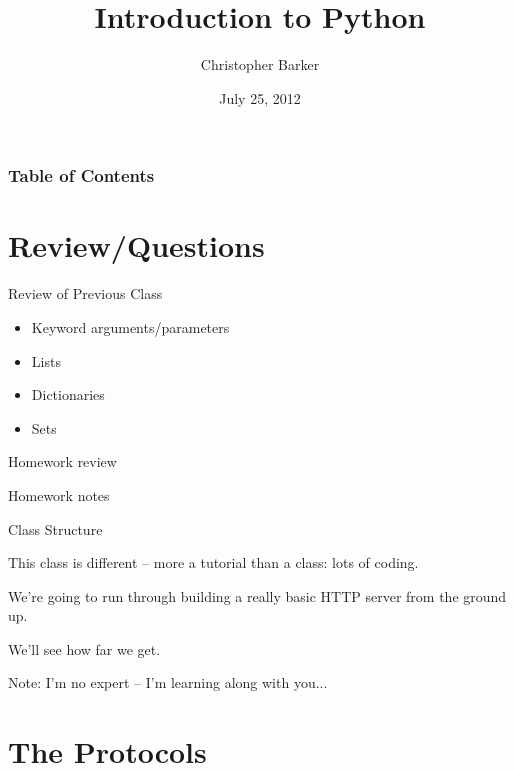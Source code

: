 \documentclass{beamer}
\title[Week 5: Building a Web Server from Scratch]{Introduction to Python}
\author{Christopher Barker}
\institute{UW Continuing Education / Isilon}
\date{July 25, 2012}
\begin{document}
\begin{frame}
  \titlepage
\end{frame}

\begin{frame}
\frametitle{Table of Contents}
  \tableofcontents
\end{frame}


\section{Review/Questions}

\begin{frame}{Review of Previous Class}

\begin{itemize}
  \item Keyword arguments/parameters
  \item Lists
  \item Dictionaries
  \item Sets
\end{itemize}

\end{frame}


\begin{frame}{Homework review}

  {\Large Homework notes }

\end{frame}

\begin{frame}{Class Structure}

{\Large
This class is different -- more a tutorial than a class: lots of coding.

\vfill
We're going to run through building a really basic HTTP server from the ground up.

\vfill
We'll see how far we get.
}

\vfill
Note: I'm no expert -- I'm learning along with you...
\end{frame}

\section{The Protocols}
\end{document}
